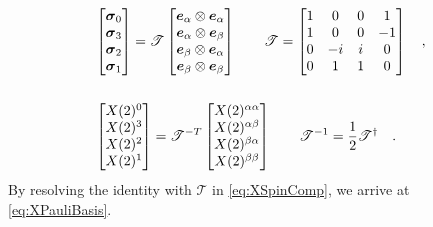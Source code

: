 \begin{subequations}
\begin{align}
\label{eq:BasisTrans}
&\begin{bmatrix}
  \pauli{0} \\
  \pauli{3} \\
  \pauli{2} \\
  \pauli{1} 
\end{bmatrix} = \mathscr{T} 
\begin{bmatrix}
  \vc{e}_\alpha \otimes \vc{e}_\alpha  \\
  \vc{e}_\alpha \otimes \vc{e}_\beta  \\
  \vc{e}_\beta  \otimes \vc{e}_\alpha   \\
  \vc{e}_\beta  \otimes \vc{e}_\beta
\end{bmatrix} \qquad
%
\mathscr{T} = 
\begin{bmatrix}
1 &  0 & 0 &  1 \\
1 &  0 & 0 & -1 \\
0 & -i & i &  0 \\
0 &  1 & 1 &  0 \\
\end{bmatrix} \quad, \\
\nonumber\\
\label{eq:CompTrans}
&\begin{bmatrix}
  \spinor{2}{X}^0 \\
  \spinor{2}{X}^3 \\
  \spinor{2}{X}^2 \\
  \spinor{2}{X}^1
\end{bmatrix} = \mathscr{T}^{-T} 
\begin{bmatrix}
  \spinor{2}{X}^{\alpha \alpha}  \\
  \spinor{2}{X}^{\alpha \beta} \\
  \spinor{2}{X}^{\beta  \alpha}   \\
  \spinor{2}{X}^{\beta  \beta}
\end{bmatrix} \qquad
%
\mathscr{T}^{-1} = \frac{1}{2} \mathscr{T}^\dagger \quad.
\end{align}
\end{subequations}
By resolving the identity with $\mathscr{T}$ in \cref{eq:XSpinComp}, we arrive at \cref{eq:XPauliBasis}.


